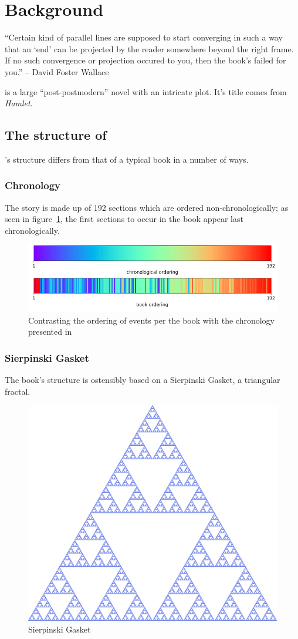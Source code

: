 \section{Background}

``Certain kind of parallel lines are supposed to start converging in such a way that an `end' can be projected by the reader somewhere beyond the right frame. If no such convergence or projection occured to you, then the book's failed for you.'' -- David Foster Wallace \cite{badger_internet_1996}

\infinitejest is a large ``post-postmodern'' novel with an intricate plot. It's title comes from \textit{Hamlet}.

\subsection{The structure of \infinitejest}

\infinitejest's structure differs from that of a typical book in a number of ways.

\subsubsection{Chronology}

The story is made up of 192 sections which are ordered non-chronologically; as seen in figure~\ref{chronology_bars}, the first sections to occur in the book appear last chronologically.

\begin{figure}[ht]
    \centering
    \includegraphics[width=.5\textwidth]{../data/plots/section_bars.png}
    \caption{Contrasting the ordering of events per the book with the chronology presented in \cite{carlisle_2007}}
    \label{chronology_bars}
\end{figure}

\subsubsection{Sierpinski Gasket}

The book's structure is ostensibly based on a Sierpinski Gasket, a triangular fractal.

\begin{figure}[ht]
    \centering
    \includegraphics[width=.25\textwidth]{images/sierpinski.png}
    \caption{Sierpinski Gasket}
    \label{Sierpinski Gasket}
\end{figure}

